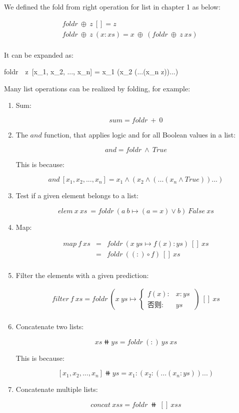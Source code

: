 \documentclass{article}
\begin{document}
We defined the fold from right operation for list in chapter 1 as below:

\[
\begin{array}{l}
foldr\ \oplus\ z\ [] = z \\
foldr\ \oplus\ z\ (x:xs) = x\ \oplus\ (foldr\ \oplus\ z\ xs) \\
\end{array}
\]

It can be expanded as:

\be
foldr\ \oplus\ z\ [x_1, x_2, ..., x_n] = x_1 \oplus (x_2 \oplus (...(x_n \oplus z))...)
\ee

Many list operations can be realized by folding, for example:

\begin{enumerate}
\item Sum:

\[
sum = foldr\ +\ 0
\]

\item The $and$ function, that applies logic and for all Boolean values in a list:

\[
and = foldr\ \land\ True
\]

This is because:

\[
and\ [x_1, x_2, ..., x_n] = x_1 \land (x_2 \land (...(x_n \land True))...)
\]

\item Test if a given element belongs to a list:

\[
elem\ x\ xs\ = foldr\ (a\ b \mapsto (a = x) \lor b)\ False\ xs
\]

\item Map:

\[
\begin{array}{rcl}
map\ f\ xs & = & foldr\ (x\ ys \mapsto f(x) : ys)\ []\ xs \\
           & = & foldr\ ((:) \circ f)\ []\ xs \\
\end{array}
\]

\item Filter the elements with a given prediction:

\[
\begin{array}{rl}
filter\ f\ xs = foldr\ (x\ ys \mapsto
  \begin{cases}
    f(x): & x:ys\ \\
    \text{否则}: & ys
  \end{cases})\ []\ xs \\
\end{array}
\]

\item Concatenate two lists:

\[
xs \doubleplus ys = foldr\ (:)\ ys\ xs
\label{eq:binary-concat}
\]

This is because:

\[
[x_1, x_2, ..., x_n] \doubleplus ys = x_1 : (x_2 : (...(x_n : ys))...)
\]

\item Concatenate multiple lists:

\[
concat\ xss = foldr\ \doubleplus\ []\ xss
\]

\end{enumerate}
\end{document}
